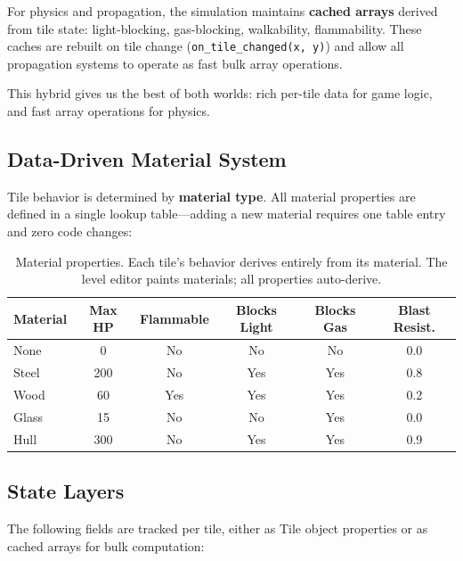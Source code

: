\documentclass[11pt,a4paper]{article}
\begin{document}
For physics and propagation, the simulation maintains \textbf{cached
arrays} derived from tile state: light-blocking, gas-blocking,
walkability, flammability.  These caches are rebuilt on tile change
(\texttt{on\_tile\_changed(x, y)}) and allow all propagation systems to
operate as fast bulk array operations.

This hybrid gives us the best of both worlds: rich per-tile data for
game logic, and fast array operations for physics.

\subsection{Data-Driven Material System}

Tile behavior is determined by \textbf{material type}.  All material
properties are defined in a single lookup table---adding a new material
requires one table entry and zero code changes:

\begin{table}[h]
\centering
\begin{tabular}{@{}lccccc@{}}
\toprule
\textbf{Material} & \textbf{Max HP} & \textbf{Flammable} & \textbf{Blocks Light} & \textbf{Blocks Gas} & \textbf{Blast Resist.} \\
\midrule
None   & 0   & No  & No  & No  & 0.0 \\
Steel  & 200 & No  & Yes & Yes & 0.8 \\
Wood   & 60  & Yes & Yes & Yes & 0.2 \\
Glass  & 15  & No  & No  & Yes & 0.0 \\
Hull   & 300 & No  & Yes & Yes & 0.9 \\
\bottomrule
\end{tabular}
\caption{Material properties.  Each tile's behavior derives entirely
from its material.  The level editor paints materials; all properties
auto-derive.}
\label{tab:materials}
\end{table}

\subsection{State Layers}

The following fields are tracked per tile, either as Tile object
properties or as cached arrays for bulk computation:
\end{document}

